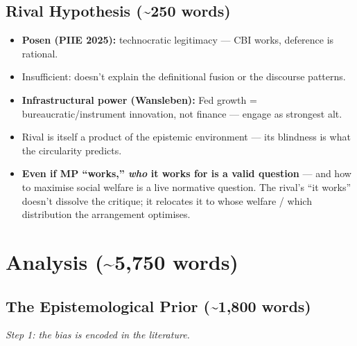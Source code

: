 \documentclass[12pt,a4paper]{article}
\begin{document}
\begin{doublespace}
\subsection{Rival Hypothesis (\textasciitilde250 words)}
\begin{itemize}
    \item \textbf{Posen (PIIE 2025):} technocratic legitimacy --- CBI works, deference is rational.
    \item Insufficient: doesn't explain the definitional fusion or the discourse patterns.
    \item \textbf{Infrastructural power (Wansleben):} Fed growth = bureaucratic/instrument innovation, not finance --- engage as strongest alt.
    \item Rival is itself a product of the epistemic environment --- its blindness is what the circularity predicts.
    \item \textbf{Even if MP ``works,'' \textit{who} it works for is a valid question} --- and how to maximise social welfare is a live normative question. The rival's ``it works'' doesn't dissolve the critique; it relocates it to whose welfare / which distribution the arrangement optimises.
\end{itemize}

\section{Analysis (\textasciitilde5,750 words)}

\subsection{The Epistemological Prior (\textasciitilde1,800 words)}
\label{sec:epistemology}

\textit{Step 1: the bias is encoded in the literature.}


\end{doublespace}
\end{document}
